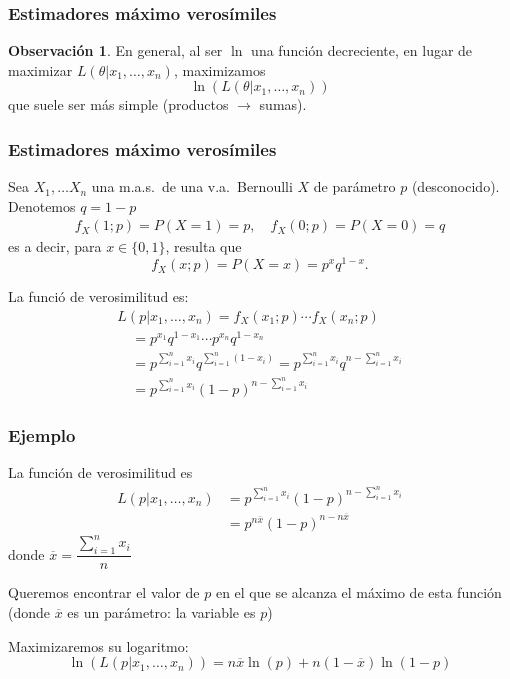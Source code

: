 \documentclass[12pt,t]{beamer}\usepackage[]{graphicx}\usepackage[]{color}
\theoremstyle{plain}
\theoremstyle{definition}
\newtheorem{obs}{Observación}
\begin{document}
\begin{frame}
\frametitle{Estimadores máximo verosímiles }

\vspace{1cm}

\begin{obs}
En general, al ser $\ln$  una función decreciente, en lugar de maximizar $L(\theta|x_1,\ldots,x_n)$, maximizamos
$$
\ln(L(\theta|x_1,\ldots,x_n))
$$
que suele ser más simple (productos $\to$ sumas).
\end{obs}
\end{frame}


\begin{frame}
\frametitle{Estimadores máximo verosímiles}
Sea $X_{1},\ldots X_{n}$ una m.a.s.\ de una v.a.\ Bernoulli $X$ de parámetro  $p$ (desconocido). Denotemos $q=1-p$
$$
\begin{array}{c}
f_X(1;p)=P(X=1)=p,\quad 
f_X(0;p)=P(X=0)=q
\end{array}
$$
es a decir, para $x\in\{0,1\}$, resulta que 
$$f_X(x;p)=P(X=x)=p^{x} q^{1-x}.$$

La funció de verosimilitud es:
$$
\begin{array}{l}
L(p|x_1,\ldots,x_n) = f_{X}(x_1;p)\cdots f_{X}(x_n;p)\\[1ex]
\quad =
p^{x_{1}}q^{1-x_{1}} \cdots  p^{x_{n}}q^{1-x_{n}}
\\[1ex]
\quad = p^{\sum_{i=1}^n x_{i}} q^{\sum_{i=1}^n (1-x_{i})}= p^{\sum_{i=1}^n x_{i}} q^{n-\sum_{i=1}^n x_{i}}\\[1ex]
\quad =p^{\sum_{i=1}^n x_{i}} (1-p)^{n-\sum_{i=1}^n x_{i}}
\end{array}
$$
\end{frame}

\begin{frame}
\frametitle{Ejemplo}
La función de verosimilitud es
$$
\begin{array}{rl}
L(p|x_1,\ldots,x_n) & =p^{\sum_{i=1}^n x_{i}} (1-p)^{n-\sum_{i=1}^n x_{i}}\\
& =p^{n\overline{x}}(1-p)^{n-n\overline{x}}
\end{array}
$$
donde $\overline{x}=\dfrac{\sum_{i=1}^n x_{i}}{n}$
\medskip


Queremos encontrar el valor de $p$ en el que se alcanza el máximo de esta función (donde $\overline{x}$ es un parámetro: la variable es $p$)
\medskip

Maximizaremos su logaritmo:
$$
\ln(L(p|x_1,\ldots,x_n))=n\overline{x}\ln(p)+n(1-\overline{x})\ln(1-p)
$$
\end{frame}
\end{document}
